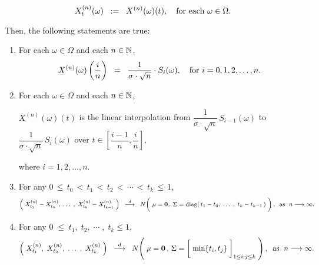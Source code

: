 \begin{proposition}
\begin{itemize}
		\begin{equation*}
		X^{(n)}_{t}(\omega) \;\; := \;\; X^{(n)}(\omega)(t),
		\quad
		\textnormal{for each $\omega \in \Omega$}.
		\end{equation*}
\end{itemize}
Then, the following statements are true:
\begin{enumerate}
\item	For each $\omega \in \Omega$ and each $n \in \mathbb{N}$,
		\begin{equation*}
		X^{(n)}(\omega)\left(\dfrac{i}{n}\right) \;\; = \;\; \dfrac{1}{\sigma\cdot\sqrt{n}}\cdot S_{i}(\omega),
		\quad
		\textnormal{for $i = 0, 1, 2, \ldots, n$}.
		\end{equation*}
\item	For each $\omega \in \Omega$ and each $n \in \mathbb{N}$, 
		\begin{center}
		$X^{(n)}(\omega)(t)$\; is the linear interpolation
		from \;$\dfrac{1}{\sigma\cdot\sqrt{n}}\,S_{i-1}(\omega)$\;
		to \;$\dfrac{1}{\sigma\cdot\sqrt{n}}\,S_{i}(\omega)$\;
		over \;$t \in \left[\dfrac{i-1}{n},\dfrac{i}{n}\right]$,
		\end{center}
		where $i = 1, 2, \ldots, n$.
\item	For any \;$0 \,\leq\, t_{0} \,<\, t_{1} \,<\, t_{2} \,<\, \cdots \,<\, t_{k} \,\leq\, 1$,
		\begin{equation*}
		\left(\;X^{(n)}_{t_{1}} - X^{(n)}_{t_{0}}, \;\ldots\;,\; X^{(n)}_{t_{k}} - X^{(n)}_{t_{k-1}}\;\right)
		\;\; \overset{d}{\longrightarrow} \;\;
		N\!\left(\;
		\mathbf{\mu} = \mathbf{0}\,,\,
		\overset{{\color{white}1}}{\Sigma} = \diag\!\left(\,t_{1}-t_{0},\; \ldots\; ,\; t_{k}-t_{k-1}\,\right)
		\;\right),
		\;\;
		\textnormal{as \;$n \longrightarrow \infty$}.
		\end{equation*}
\item	For any \;$0 \;\leq\; t_{1},\; t_{2}, \;\cdots\;,\; t_{k} \leq 1$,
		\begin{equation*}
		\left(\;X^{(n)}_{t_{1}},\; X^{(n)}_{t_{2}}, \;\ldots\;,\; X^{(n)}_{t_{k}}\;\right)
		\;\; \overset{d}{\longrightarrow} \;\;
		N\!\left(\;
		\mathbf{\mu} = \mathbf{0}\,,\,
		\Sigma = \left[\;\min\{\overset{{\color{white}1}}{t}_{i},t_{j}\}\;\right]_{1\leq i,j\leq k}
		\;\right),
		\;\;\textnormal{as \;$n \longrightarrow \infty$}.
		\end{equation*}
\end{enumerate}
\end{proposition}
\proof
